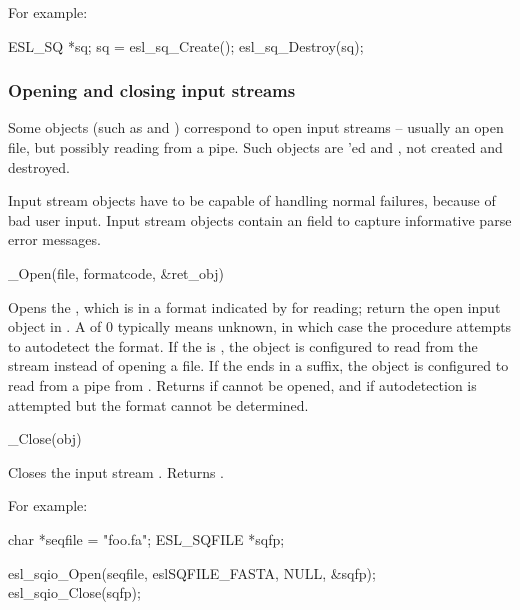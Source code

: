 For example:
\begin{cchunk}
   ESL_SQ *sq;
   sq = esl_sq_Create();
   esl_sq_Destroy(sq);
\end{cchunk}

  \subsubsection{Opening and closing input streams}

Some objects (such as  and )
correspond to open input streams -- usually an open file, but possibly
reading from a pipe. Such objects are 'ed and
, not created and destroyed.

Input stream objects have to be capable of handling normal failures,
because of bad user input. Input stream objects contain an
 field to capture informative parse error
messages. 

\begin{sreapi}
\hypertarget{ifc:Open} 
{\item[\_Open(file, formatcode, \&ret\_obj)]}

Opens the , which is in a format indicated by
 for reading; return the open input object in
. A  of 0 typically means unknown,
in which case the  procedure attempts to autodetect
the format. If the  is , the object is
configured to read from the  stream instead of opening a
file. If the  ends in a  suffix, the object is
configured to read from a pipe from . Returns
 if  cannot be opened, and
 if autodetection is attempted but the format cannot
be determined.

\hypertarget{ifc:Close} 
{\item[\_Close(obj)]}

Closes the input stream . Returns .
\end{sreapi}


For example:

\begin{cchunk}
    char        *seqfile = "foo.fa";
    ESL_SQFILE  *sqfp;

    esl_sqio_Open(seqfile, eslSQFILE_FASTA, NULL, &sqfp);
    esl_sqio_Close(sqfp);
\end{cchunk}


